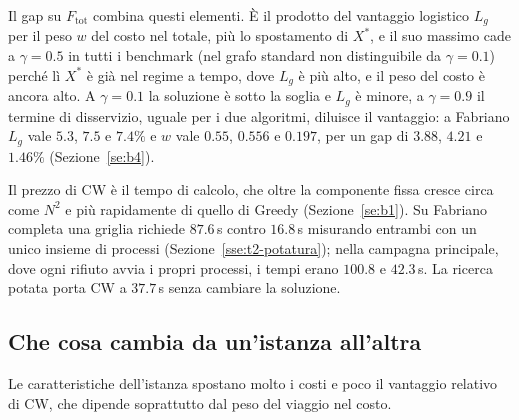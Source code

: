 Il gap su $F_{\mathrm{tot}}$ combina questi elementi. È il prodotto del vantaggio logistico $L_g$ per il peso $w$ del costo nel totale, più lo spostamento di $X^*$, e il suo massimo cade a $\gamma=0.5$ in tutti i benchmark (nel grafo standard non distinguibile da $\gamma=0.1$) perché lì $X^*$ è già nel regime a tempo, dove $L_g$ è più alto, e il peso del costo è ancora alto. A $\gamma=0.1$ la soluzione è sotto la soglia e $L_g$ è minore, a $\gamma=0.9$ il termine di disservizio, uguale per i due algoritmi, diluisce il vantaggio: a Fabriano $L_g$ vale $5.3$, $7.5$ e $7.4\%$ e $w$ vale $0.55$, $0.556$ e $0.197$, per un gap di $3.88$, $4.21$ e $1.46\%$ (Sezione~\ref{se:b4}).

Il prezzo di CW è il tempo di calcolo, che oltre la componente fissa cresce circa come $N^2$ e più rapidamente di quello di Greedy (Sezione~\ref{se:b1}). Su Fabriano completa una griglia richiede $87.6$\,s contro $16.8$\,s misurando entrambi con un unico insieme di processi (Sezione~\ref{sse:t2-potatura}); nella campagna principale, dove ogni rifiuto avvia i propri processi, i tempi erano $100.8$ e $42.3$\,s. La ricerca potata porta CW a $37.7$\,s senza cambiare la soluzione.

\newpage
\subsection{Che cosa cambia da un'istanza all'altra}\label{sse:disc-istanze}

Le caratteristiche dell'istanza spostano molto i costi e poco il vantaggio relativo di CW, che dipende soprattutto dal peso del viaggio nel costo.

